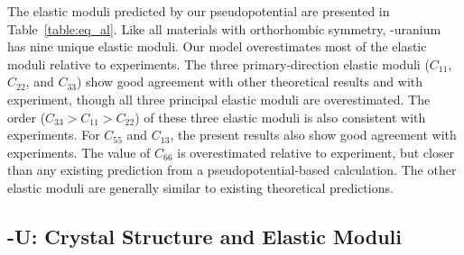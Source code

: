 The elastic moduli predicted by our pseudopotential are
presented in Table~\ref{table:eq_al}. Like all materials with
orthorhombic symmetry, \textalpha-uranium has nine unique elastic
moduli. Our model overestimates most of the elastic moduli
relative to experiments. The three primary-direction elastic
moduli ($C_{11}$, $C_{22}$, and $C_{33}$) show good agreement
with other theoretical results and with experiment, though all
three principal elastic moduli are overestimated.
The order ($C_{33} > C_{11} > C_{22}$) of these three elastic
moduli is also consistent with experiments. For $C_{55}$ and
$C_{13}$, the present results also show good agreement with
experiments.  The value of $C_{66}$ is overestimated relative to
experiment, but closer than any existing prediction from a
pseudopotential-based calculation. The other elastic moduli are
generally similar to existing theoretical predictions.

\subsection{\textgamma-U: Crystal Structure and Elastic Moduli}
\label{subsec_gamma}

